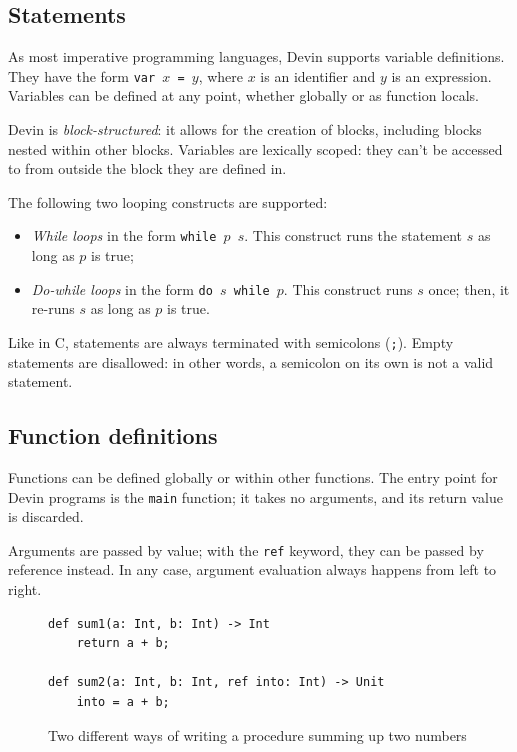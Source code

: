 \documentclass[11pt, american, draft]{PhdThesis}
\begin{document}
  \subsection{Statements}

  As most imperative programming languages, Devin supports variable definitions. They have the form
  \mbox{\texttt{var $x$ = $y$}}, where $x$ is an identifier and $y$ is an expression. Variables can
  be defined at any point, whether globally or as function locals.

  Devin is \emph{block-structured}: it allows for the creation of blocks, including blocks nested
  within other blocks. Variables are lexically scoped: they can't be accessed to from outside the
  block they are defined in.

  The following two looping constructs are supported:

  \begin{itemize}[noitemsep,topsep=0pt]
    \item \emph{While loops} in the form \mbox{\texttt{while $p$ $s$}}. This construct runs the
          statement $s$ as long as $p$ is true;

    \item \emph{Do-while loops} in the form \mbox{\texttt{do $s$ while $p$}}. This construct runs
          $s$ once; then, it re-runs $s$ as long as $p$ is true.
  \end{itemize}

  Like in C, statements are always terminated with semicolons (\verb$;$). Empty statements are
  disallowed: in other words, a semicolon on its own is not a valid statement.

  \subsection{Function definitions}

  Functions can be defined globally or within other functions. The entry point for Devin programs is
  the \verb$main$ function; it takes no arguments, and its return value is discarded.

  Arguments are passed by value; with the \texttt{ref} keyword, they can be passed by reference
  instead. In any case, argument evaluation always happens from left to right.

  \begin{figure}[H]
    \center

\begin{verbatim}
def sum1(a: Int, b: Int) -> Int
    return a + b;

def sum2(a: Int, b: Int, ref into: Int) -> Unit
    into = a + b;
\end{verbatim}

    \caption{Two different ways of writing a procedure summing up two numbers}
  \end{figure}
\end{document}
